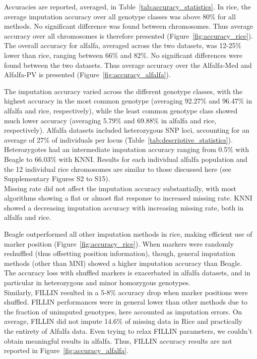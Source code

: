 Accuracies are reported, averaged, in Table~\ref{tab:accuracy_statistics}. In rice, the average imputation accuracy over all genotype classes was above 80\% for all methods. No significant difference was found between chromosomes. Thus average accuracy over all chromosomes is therefore presented (Figure~\ref{fig:accuracy_rice}). \\
The overall accuracy for alfalfa, averaged across the two datasets, was 12-25\% lower than rice, ranging between 66\% and 82\%. No significant differences were found between the two datasets. Thus average accuracy over the Alfalfa-Med and Alfalfa-PV is presented (Figure~\ref{fig:accuracy_alfalfa}).

The imputation accuracy varied across the different genotype classes, with the highest accuracy in the most common genotype (averaging 92.27\% and 96.47\% in alfalfa and rice, respectively), while the least common genotype class showed much lower accuracy (averaging 5.79\% and 69.88\% in alfalfa and rice, respectively).
Alfalfa datasets included heterozygous SNP loci, accounting for an average of 27\% of individuals per locus (Table~\ref{tab:descriptive_statistics}). Heterozygotes had an intermediate imputation accuracy ranging from 0.5\% with Beagle to 66.03\% with KNNI. Results for each individual alfalfa population and the 12 individual rice chromosomes are similar to those discussed here (see Supplementary Figures S2 to S15). \\
Missing rate did not affect the imputation accuracy substantially, with most algorithms showing a flat or almost flat response to increased missing rate. KNNI showed a decreasing imputation accuracy with increasing missing rate, both in alfalfa and rice.

Beagle outperformed all other imputation methods in rice, making efficient use of marker position (Figure~\ref{fig:accuracy_rice}). When markers were randomly reshuffled (thus offsetting position information), though, general imputation methods (other than MNI) showed a higher imputation accuracy than Beagle. The accuracy loss with shuffled markers is exacerbated in alfalfa datasets, and in particular in heterozygous and minor homozygous genotypes.\\
Similarly, FILLIN resulted in a 5-8\% accuracy drop when marker positions were shuffled. FILLIN performances were in general lower than other methods due to the fraction of unimputed genotypes, here accounted as imputation errors. On average, FILLIN did not impute 14.6\% of missing data in Rice and practically the entirety of Alfalfa data. Even trying to relax FILLIN parameters, we couldn't obtain meaningful results in alfalfa. Thus, FILLIN accuracy results are not reported in Figure~\ref{fig:accuracy_alfalfa}.

